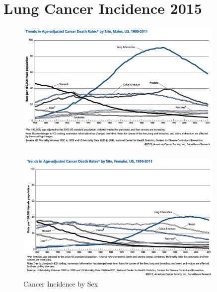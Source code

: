 \newpage
\section*{Lung Cancer Incidence 2015}

\begin{figure}[h]
  \vspace*{\fill}
  \centering
  \includegraphics[width=0.9\textwidth]{./figures/supplementary/acsMenLungCancer.png}
  \label{fig:acsMen}\par\vfill
  \includegraphics[width=0.9\textwidth]{./figures/supplementary/acsWomenLungCancer.png}
  \caption{Cancer Incidence by Sex \citep{siegel2015}}
  \label{fig:acsWomen}
\end{figure}


